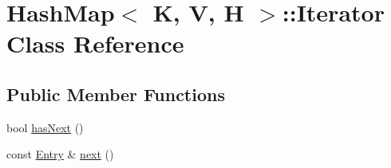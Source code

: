 \hypertarget{class_hash_map_1_1_iterator}{\section{Hash\-Map$<$ K, V, H $>$\-:\-:Iterator Class Reference}
\label{class_hash_map_1_1_iterator}
}
\subsection*{Public Member Functions}
\begin{DoxyCompactItemize}
\item 
bool \hyperlink{class_hash_map_1_1_iterator_a5e7786cabee60410293e51b666301a07}{has\-Next} ()
\item 
const \hyperlink{class_hash_map_1_1_entry}{Entry} \& \hyperlink{class_hash_map_1_1_iterator_ae6ac3c70c50e2192bdfe66fbf68232ed}{next} ()
\end{DoxyCompactItemize}


